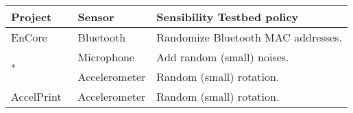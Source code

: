 \begin{table}
\scriptsize
\centering

\bgroup
\def\arraystretch{1.15}%
\begin{tabular}{|l|l|l|}
\hline
{\bf Project} & {\bf Sensor} & {\bf Sensibility Testbed policy}  \\\hline

\multirow{2}{*}{EnCore~\cite{aditya2014encore}}  & \multirow{2}{*}{Bluetooth} & 
\multirow{2}{3.5cm}{Randomize Bluetooth MAC addresses.}  \\
& &  \\\hline


\multirow{2}{*}{\cite{bojinov2014mobile}\textsuperscript{*}} & Microphone  
& Add random (small) noises. \\ \cline{2-3}
& Accelerometer & Random (small) rotation.  \\ \hline

AccelPrint~\cite{dey2014accelprint} & Accelerometer & Random (small) 
rotation.   \\ \hline


\end{tabular}
\end{table}
